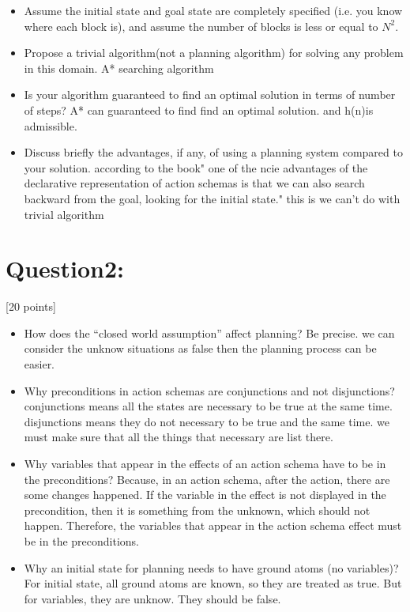\documentclass{article}
\begin{document}
\begin{itemize}
    \item Assume the initial state and goal state are completely specified (i.e. you know where each block is), and assume the number of blocks is less or equal to $N^2$.
    \item Propose a trivial algorithm(not a planning algorithm) for solving any problem in this domain.\newline
    A* searching algorithm
    \item Is your algorithm guaranteed to find an optimal solution in terms of number of steps?\newline
    A* can guaranteed to find find an optimal solution. and h(n)is admissible.
    \item Discuss briefly the advantages, if any, of using a planning system compared to your solution.\newline
    according to the book" one of the ncie advantages of the declarative representation of action schemas is that we can also search backward from the goal, looking for the initial state." this is we can't do with trivial algorithm
    
\end{itemize}

\section{Question2:}
[20 points]
\begin{itemize}
    \item How does the ``closed world assumption'' affect planning? Be precise.\newline
    we can consider the unknow situations as false then the planning process can be easier.
    \item Why preconditions in action schemas are conjunctions and not disjunctions? \newline
    conjunctions means all the states are necessary to be true at the same time.
    disjunctions means they do not necessary to be true and the same time. 
    we must make sure that all the things that necessary are list there.
    \item Why variables that appear in the effects of an action schema have to be in the preconditions?\newline
    Because, in an action schema, after the action, there are some changes happened. If the variable in the effect is not displayed in the precondition, then it is something from the unknown, which should not happen. Therefore, the variables that appear in the action schema effect must be in the preconditions.
    \item Why an initial state for planning needs to have ground atoms (no variables)?\newline
    For initial state, all ground atoms are known, so they are treated as true. But for variables, they are unknow. They should be false. 
    
    

\end{itemize}
\end{document}
